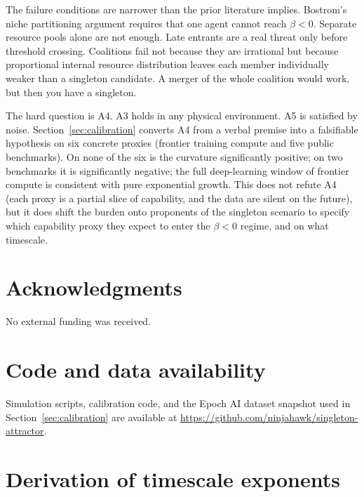 \documentclass[11pt,letterpaper]{article}
\theoremstyle{plain}
\theoremstyle{definition}
\theoremstyle{remark}
\begin{document}
The failure conditions are narrower than the prior literature implies.
Bostrom's niche partitioning argument requires that one agent cannot reach
$\beta < 0$. Separate resource pools alone are not enough.
Late entrants are a real threat only before threshold crossing.
Coalitions fail not because they are irrational but because proportional
internal resource distribution leaves each member individually weaker than a
singleton candidate.
A merger of the whole coalition would work, but then you have a singleton.

The hard question is A4.
A3 holds in any physical environment.
A5 is satisfied by noise.
Section~\ref{sec:calibration} converts A4 from a verbal premise into a
falsifiable hypothesis on six concrete proxies (frontier training
compute and five public benchmarks).
On none of the six is the curvature significantly positive; on two
benchmarks it is significantly negative; the full deep-learning window
of frontier compute is consistent with pure exponential growth.
This does not refute A4 (each proxy is a partial slice of capability,
and the data are silent on the future), but it does shift the burden
onto proponents of the singleton scenario to specify which capability
proxy they expect to enter the $\beta < 0$ regime, and on what
timescale.

\section*{Acknowledgments}

No external funding was received.

\section*{Code and data availability}

Simulation scripts, calibration code, and the Epoch AI dataset
snapshot used in Section~\ref{sec:calibration} are available at
\url{https://github.com/ninjahawk/singleton-attractor}.




\appendix

\section{Derivation of timescale exponents}
\label{app:timescale}
\end{document}
